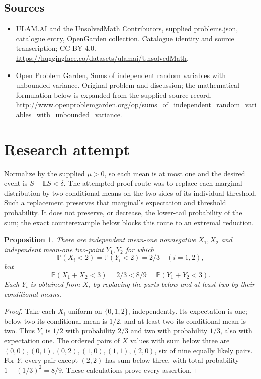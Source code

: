 \documentclass[11pt,a4paper]{article}
\newtheorem{proposition}{Proposition}
\begin{document}
\subsection{Sources}
\begin{itemize}
\item[S1] ULAM.AI and the UnsolvedMath Contributors, supplied problems.json, catalogue entry, OpenGarden collection. Catalogue identity and source transcription; CC BY 4.0.
\url{https://huggingface.co/datasets/ulamai/UnsolvedMath}.
\item[S2] Open Problem Garden, Sums of independent random variables with unbounded variance. Original problem and discussion; the mathematical formulation below is expanded from the supplied source record.
\url{http://www.openproblemgarden.org/op/sums_of_independent_random_variables_with_unbounded_variance}.
\end{itemize}


\section{Research attempt}
Normalize by the supplied $\mu>0$, so each mean is at most one and the desired event is $S-\mathbb ES<\delta$. The attempted proof route was to replace each marginal distribution by two conditional means on the two sides of its individual threshold. Such a replacement preserves that marginal's expectation and threshold probability. It does not preserve, or decrease, the lower-tail probability of the sum; the exact counterexample below blocks this route to an extremal reduction.

\begin{proposition}
There are independent mean-one nonnegative $X_1,X_2$ and independent mean-one two-point $Y_1,Y_2$ for which
\[
 \mathbb P(X_i<2)=\mathbb P(Y_i<2)=2/3\quad(i=1,2),
\]
but
\[
 \mathbb P(X_1+X_2<3)=2/3<8/9=
 \mathbb P(Y_1+Y_2<3).
\]
Each $Y_i$ is obtained from $X_i$ by replacing the parts below and at least two by their conditional means.
\end{proposition}
\begin{proof}
Take each $X_i$ uniform on $\{0,1,2\}$, independently. Its expectation is one; below two its conditional mean is $1/2$, and at least two its conditional mean is two. Thus $Y_i$ is $1/2$ with probability $2/3$ and two with probability $1/3$, also with expectation one. The ordered pairs of $X$ values with sum below three are $(0,0),(0,1),(0,2),(1,0),(1,1),(2,0)$, six of nine equally likely pairs. For $Y$, every pair except $(2,2)$ has sum below three, with total probability $1-(1/3)^2=8/9$. These calculations prove every assertion.
\end{proof}
\end{document}
